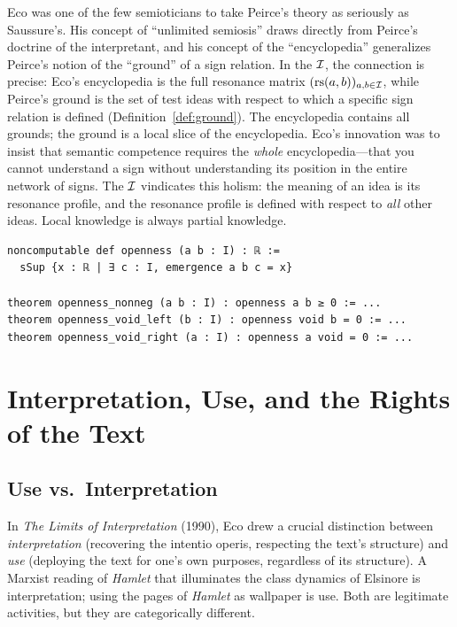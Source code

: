 \begin{remark}
Eco was one of the few semioticians to take Peirce's theory as seriously as Saussure's. His concept of ``unlimited semiosis'' draws directly from Peirce's doctrine of the interpretant, and his concept of the ``encyclopedia'' generalizes Peirce's notion of the ``ground'' of a sign relation. In the $\mathcal{I}$, the connection is precise: Eco's encyclopedia is the full resonance matrix $(\mathrm{rs}(a, b))_{a, b \in \mathcal{I}}$, while Peirce's ground is the set of test ideas with respect to which a specific sign relation is defined (Definition~\ref{def:ground}). The encyclopedia contains all grounds; the ground is a local slice of the encyclopedia. Eco's innovation was to insist that semantic competence requires the \emph{whole} encyclopedia---that you cannot understand a sign without understanding its position in the entire network of signs. The $\mathcal{I}$ vindicates this holism: the meaning of an idea is its resonance profile, and the resonance profile is defined with respect to \emph{all} other ideas. Local knowledge is always partial knowledge.
\end{remark}

\begin{lstlisting}[caption={The spectrum of textual openness}]
noncomputable def openness (a b : I) : ℝ :=
  sSup {x : ℝ | ∃ c : I, emergence a b c = x}

theorem openness_nonneg (a b : I) : openness a b ≥ 0 := ...
theorem openness_void_left (b : I) : openness void b = 0 := ...
theorem openness_void_right (a : I) : openness a void = 0 := ...
\end{lstlisting}

\section{Interpretation, Use, and the Rights of the Text}

\subsection{Use vs.\ Interpretation}

In \textit{The Limits of Interpretation} (1990), Eco drew a crucial
distinction between \emph{interpretation} (recovering the intentio
operis, respecting the text's structure) and \emph{use} (deploying
the text for one's own purposes, regardless of its structure). A
Marxist reading of \textit{Hamlet} that illuminates the class dynamics
of Elsinore is interpretation; using the pages of \textit{Hamlet} as
wallpaper is use. Both are legitimate activities, but they are
categorically different.

